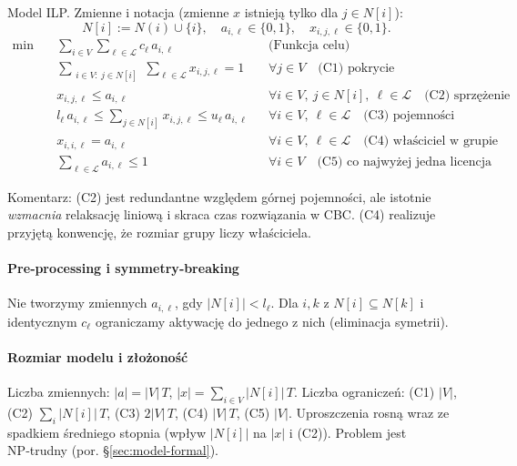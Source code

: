 Model ILP. Zmienne i notacja (zmienne $x$ istnieją tylko dla $j\in N[i]$):
\[
N[i] := N(i)\cup\{i\},\quad a_{i,\ell}\in\{0,1\},\quad x_{i,j,\ell}\in\{0,1\}.
\]
\begin{align}
\min\quad & \sum_{i\in V}\sum_{\ell\in\mathcal{L}} c_\ell\, a_{i,\ell} && \text{(Funkcja celu)}\\[4pt]
& \sum_{\substack{i\in V:\ j\in N[i]}}\sum_{\ell\in\mathcal{L}} x_{i,j,\ell} = 1 && \forall j\in V \quad \text{(C1) pokrycie} \label{C1}\\[2pt]
& x_{i,j,\ell} \le a_{i,\ell} && \forall i\in V,\ j\in N[i],\ \ell\in\mathcal{L} \quad \text{(C2) sprzężenie} \label{C2}\\[2pt]
& l_\ell\, a_{i,\ell} \le \sum_{j\in N[i]} x_{i,j,\ell} \le u_\ell\, a_{i,\ell} && \forall i\in V,\ \ell\in\mathcal{L} \quad \text{(C3) pojemności} \label{C3}\\[2pt]
& x_{i,i,\ell} = a_{i,\ell} && \forall i\in V,\ \ell\in\mathcal{L} \quad \text{(C4) właściciel w grupie} \label{C4}\\[2pt]
& \sum_{\ell\in\mathcal{L}} a_{i,\ell} \le 1 && \forall i\in V \quad \text{(C5) co najwyżej jedna licencja} \label{C5}
\end{align}

\noindent Komentarz: (C2) jest redundantne względem górnej pojemności, ale istotnie \emph{wzmacnia} relaksację liniową i skraca czas rozwiązania w CBC. (C4) realizuje przyjętą konwencję, że rozmiar grupy liczy właściciela.

\paragraph{Pre‑processing i symmetry‑breaking}
Nie tworzymy zmiennych $a_{i,\ell}$, gdy $|N[i]|<l_\ell$. Dla $i,k$ z $N[i]\subseteq N[k]$ i identycznym $c_\ell$ ograniczamy aktywację do jednego z nich (eliminacja symetrii).

\paragraph{Rozmiar modelu i złożoność}
Liczba zmiennych: $|a|=|V|\,T$, $|x|=\sum\limits_{i\in V} |N[i]|\,T$. Liczba ograniczeń: (C1) $|V|$, (C2) $\sum_i |N[i]|\,T$, (C3) $2|V|\,T$, (C4) $|V|\,T$, (C5) $|V|$. Uproszczenia rosną wraz ze spadkiem średniego stopnia (wpływ $|N[i]|$ na $|x|$ i (C2)). Problem jest NP‑trudny (por. \S\ref{sec:model-formal}).


